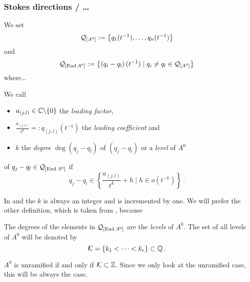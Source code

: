 \subsubsection{Stokes directions / \dots}
\begin{comment}
  \cite[I.4]{Loday1994}
\end{comment}
We set
\[
  \mathcal{Q}_{[A^0]}:=\left\{q_1(t^{-1}),\dots,q_n(t^{-1})\right\}
\]
and
\[
  \mathcal{Q}_{[\operatorname{End} A^0]}:=\left\{\left(q_i-q_l\right)(t^{-1})
    \mid q_i \neq q_l \in\mathcal{Q}_{[A^0]}
  \right\}
\]
where\dots
\begin{defn}
  We call
  \begin{itemize}
    \item $a_{(j,l)}\in\mathbb{C}\backslash\{0\}$ the \emph{leading factor},
    \item $\frac{a_{(j,l)}}{t^k}=:q_{(j,l)}(t^{-1})$ the \emph{leading
      coefficient} and
    \item $k$ the \emph{degree} $\deg(q_j-q_l)$ of $(q_j-q_l)$ or a
      \emph{level} of $A^0$
  \end{itemize}
  of $q_j-q_l\in\mathcal{Q}_{[\operatorname{End} A^0]}$ if
  \[
    q_j-q_l\in\left\{ \frac{a_{(j,l)}}{t^k}+h \mid h \in o(t^{-k})\right\} \,.
  \]
  \begin{rem}
    In \cite{boalch} and \cite{thboalch} the $k$ is always an integer and
    is incremented by one. We will prefer the other definition, which is
    taken from \cite{Loday1994}, because \TODO
  \end{rem}
  The degrees of the elements in $\mathcal{Q}_{[\operatorname{End} A^0]}$ are the
  \emph{levels} of $A^0$.
  The set of all levels of $A^0$ will be denoted by
  \[
    \mathcal{K}=\{k_1<\dots<k_r\} \subset \mathbb{Q} \,.
  \]
  \begin{rem}
    $A^0$ is unramified if and only if $\mathcal{K}\subset\mathbb{Z}$. Since we only look at
    the unramified case, this will be always the case.
  \end{rem}
\end{defn}

